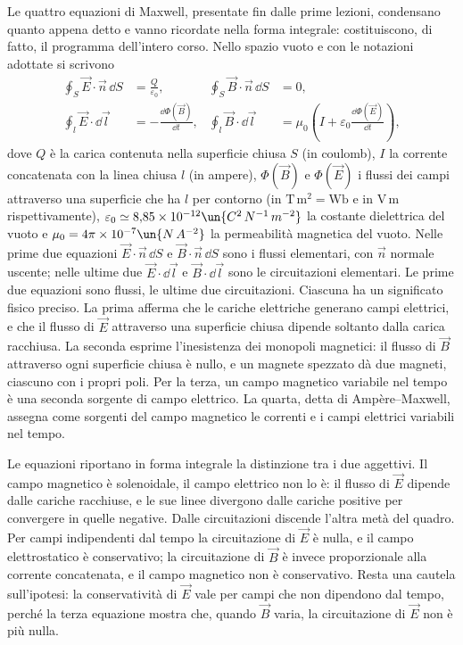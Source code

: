 \documentclass[main.tex]{subfiles}
\begin{document}
Le quattro equazioni di Maxwell, presentate fin dalle prime lezioni, condensano quanto appena detto e vanno ricordate nella forma integrale: costituiscono, di fatto, il programma dell'intero corso. Nello spazio vuoto e con le notazioni adottate si scrivono
\begin{align*}
\oint_S\vec E\cdot\vec n\,\dd S&=\frac{Q}{\varepsilon_0}, &
\oint_S\vec B\cdot\vec n\,\dd S&=0,\\
\oint_l\vec E\cdot\dd\vec l&=-\frac{\dd\Phi(\vec B)}{\dd t}, &
\oint_l\vec B\cdot\dd\vec l&=\mu_0\left(I+\varepsilon_0\frac{\dd\Phi(\vec E)}{\dd t}\right),
\end{align*}
dove $Q$ è la carica contenuta nella superficie chiusa $S$ (in coulomb), $I$ la corrente concatenata con la linea chiusa $l$ (in ampere), $\Phi(\vec B)$ e $\Phi(\vec E)$ i flussi dei campi attraverso una superficie che ha $l$ per contorno (in $\mathrm{T\,m^2}=\mathrm{Wb}$ e in $\mathrm{V\,m}$ rispettivamente), $\varepsilon_0\simeq8{,}85\times10^{-12}\un{C^2\,N^{-1}\,m^{-2}}$ la costante dielettrica del vuoto e $\mu_0=4\pi\times10^{-7}\un{N\,A^{-2}}$ la permeabilità magnetica del vuoto. Nelle prime due equazioni $\vec E\cdot\vec n\,\dd S$ e $\vec B\cdot\vec n\,\dd S$ sono i flussi elementari, con $\vec n$ normale uscente; nelle ultime due $\vec E\cdot\dd\vec l$ e $\vec B\cdot\dd\vec l$ sono le circuitazioni elementari. Le prime due equazioni sono flussi, le ultime due circuitazioni. Ciascuna ha un significato fisico preciso. La prima afferma che le cariche elettriche generano campi elettrici, e che il flusso di $\vec E$ attraverso una superficie chiusa dipende soltanto dalla carica racchiusa. La seconda esprime l'inesistenza dei monopoli magnetici: il flusso di $\vec B$ attraverso ogni superficie chiusa è nullo, e un magnete spezzato dà due magneti, ciascuno con i propri poli. Per la terza, un campo magnetico variabile nel tempo è una seconda sorgente di campo elettrico. La quarta, detta di Ampère--Maxwell, assegna come sorgenti del campo magnetico le correnti e i campi elettrici variabili nel tempo.

Le equazioni riportano in forma integrale la distinzione tra i due aggettivi. Il campo magnetico è solenoidale, il campo elettrico non lo è: il flusso di $\vec E$ dipende dalle cariche racchiuse, e le sue linee divergono dalle cariche positive per convergere in quelle negative. Dalle circuitazioni discende l'altra metà del quadro. Per campi indipendenti dal tempo la circuitazione di $\vec E$ è nulla, e il campo elettrostatico è conservativo; la circuitazione di $\vec B$ è invece proporzionale alla corrente concatenata, e il campo magnetico non è conservativo. Resta una cautela sull'ipotesi: la conservatività di $\vec E$ vale per campi che non dipendono dal tempo, perché la terza equazione mostra che, quando $\vec B$ varia, la circuitazione di $\vec E$ non è più nulla.
\end{document}
